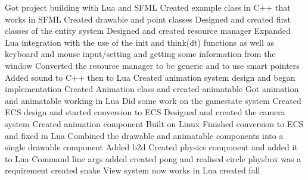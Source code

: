 \documentclass[11pt,a4paper,titlepage]{article}
\begin{document}
	Got project building with Lua and SFML
	Created example class in C++ that works in SFML
	Created drawable and point classes
	Designed and created first classes of the entity system
	Designed and created resource manager
	Expanded Lua integration with the use of the init and think(dt) functions as well as  keyboard and mouse input/setting and getting some information from the window
	Converted the resource manager to be generic and to use smart pointers
	Added sound to C++ then to Lua
	Created animation system design and began implementation
	Created Animation class and created animatable
	Got animation and animatable working in Lua
	Did some work on the gamestate system
	Created ECS design and started conversion to ECS	
	Designed and created the camera system
	Created animation component
	Built on Linux
	Finished conversion to ECS and fixed in Lua
	Combined the drawable and animatable components into a single drawable component
	Added b2d
	Created physics component and added it to Lua
	Command line args added
	created pong and realised circle physbox was a requirement
	created snake
	View system now works in Lua
	created fall

	\printbibliography{}
\end{document}
